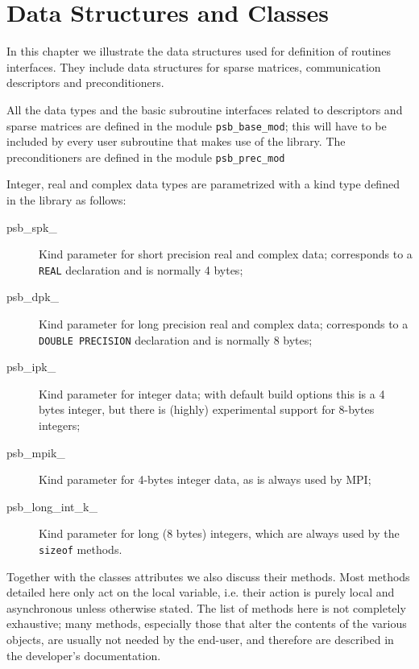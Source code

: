 \section{Data Structures and Classes}
\label{sec:datastruct}

In this chapter we  illustrate the  data structures used for definition of
routines interfaces. They  include data structures for sparse matrices,
communication descriptors and preconditioners.%

All the data types and the basic subroutine interfaces related to
descriptors and sparse matrices are defined in
the module \verb|psb_base_mod|; this will have to be included by every
user subroutine that makes use of the library. The preconditioners are
defined in the module \verb|psb_prec_mod|

Integer, real and complex data types are parametrized with a kind type
defined in the library as follows: 
\begin{description}
\item[psb\_spk\_] Kind parameter for short precision real and complex
  data; corresponds to a \verb|REAL| declaration and is
  normally 4 bytes; 
\item[psb\_dpk\_] Kind parameter for long precision real and complex
  data; corresponds to a \verb|DOUBLE PRECISION| declaration and is
  normally 8 bytes;
\item[psb\_ipk\_] Kind parameter for integer data;
  with default build options this is a 4 bytes integer, but there is
  (highly) experimental support for 8-bytes integers;  
\item[psb\_mpik\_] Kind parameter for 4-bytes integer data, as is
  always used by MPI; 
\item[psb\_long\_int\_k\_] Kind parameter for long (8 bytes) integers, 
  which are always used by the \verb|sizeof| methods.
\end{description}
Together with the classes attributes we also discuss their
methods.  Most methods detailed here only act on the local variable,
i.e. their action is purely local and asynchronous unless otherwise
stated. 
The list of methods here is not completely exhaustive; many methods,
especially those that alter the contents of the various objects, are
usually not needed by the end-user, and therefore are described in the
developer's documentation. 



